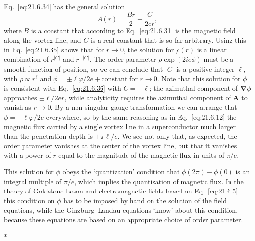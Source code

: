 Eq.~\eqref{eq:21.6.34} has the general solution
\begin{equation}
A(r)=\frac{Br}{2}+\frac{C}{2er},
\tag{21.6.36}\label{eq:21.6.36}
\end{equation}
where $B$ is a constant that according to Eq.~\eqref{eq:21.6.31} is the magnetic field along the vortex line, and $C$ is a real constant that is so far arbitrary. Using this in Eq.~\eqref{eq:21.6.35} shows that for $r\to0$, the solution for $\rho(r)$ is a linear combination of $r^{|C|}$ and $r^{-|C|}$. The order parameter $\rho\exp(2ie\phi)$ must be a smooth function of position, so we can conclude that $|C|$ is a positive integer $\ell$, with $\rho\propto r^\ell$ and $\phi=\pm\ell\varphi/2e+\text{constant}$ for $r\to0$. Note that this solution for $\phi$ is consistent with Eq.~\eqref{eq:21.6.36} with $C=\pm\ell$; the azimuthal component of $\boldsymbol\nabla\phi$ approaches $\pm\ell/2er$, while analyticity requires the azimuthal component of $\mathbf A$ to vanish as $r\to0$. By a non-singular gauge transformation we can arrange that $\phi=\pm\ell\varphi/2e$ everywhere, so by the same reasoning as in Eq.~\eqref{eq:21.6.12} the magnetic flux carried by a single vortex line in a superconductor much larger than the penetration depth is $\pm\pi\ell/e$. We see not only that, as expected, the order parameter vanishes at the center of the vortex line, but that it vanishes with a power of $r$ equal to the magnitude of the magnetic flux in units of $\pi/e$.

This solution for $\phi$ obeys the `quantization' condition that $\phi(2\pi)-\phi(0)$ is an integral multiple of $\pi/e$, which implies the quantization of magnetic flux. In the theory of Goldstone boson and electromagnetic fields based on Eq.~\eqref{eq:21.6.5} this condition on $\phi$ has to be imposed by hand on the solution of the field equations, while the Ginzburg--Landau equations `know' about this condition, because these equations are based on an appropriate choice of order parameter.

\begin{center}
* \quad * \quad *
\end{center}


